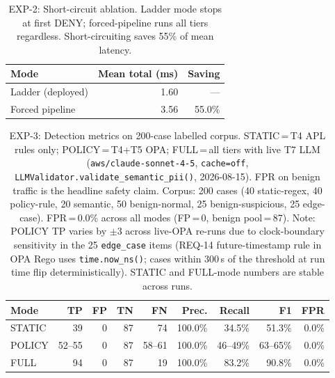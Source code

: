 \begin{table}[t]
\centering
\small
\caption{EXP-2: Short-circuit ablation.
  Ladder mode stops at first DENY; forced-pipeline runs all tiers regardless.
  Short-circuiting saves 55\% of mean latency.}
\label{tab:exp2-ablation}
\begin{tabular}{lrr}
\hline
\textbf{Mode} & \textbf{Mean total (ms)} & \textbf{Saving} \\
\hline
Ladder (deployed)  & 1.60 & —     \\
Forced pipeline    & 3.56 & 55.0\% \\
\hline
\end{tabular}
\end{table}

\begin{table}[t]
\centering
\small
\caption{EXP-3: Detection metrics on 200-case labelled corpus.
  STATIC\,=\,T4 APL rules only; POLICY\,=\,T4+T5 OPA; FULL\,=\,all tiers
  with live T7 LLM (\texttt{aws/claude-sonnet-4-5}, \texttt{cache=off},
  \texttt{LLMValidator.validate\_semantic\_pii()}, 2026-08-15).
  FPR on benign traffic is the headline safety claim.
  Corpus: 200 cases (40 static-regex, 40 policy-rule, 20 semantic,
  50 benign-normal, 25 benign-suspicious, 25 edge-case).
  FPR\,=\,0.0\% across all modes (FP\,=\,0, benign pool\,=\,87).
  Note: POLICY TP varies by $\pm$3 across live-OPA re-runs due to
  clock-boundary sensitivity in the 25 \texttt{edge\_case} items
  (REQ-14 future-timestamp rule in OPA Rego uses \texttt{time.now\_ns()};
  cases within 300\,s of the threshold at run time flip deterministically).
  STATIC and FULL-mode numbers are stable across runs.}
\label{tab:exp3-detection}
\begin{tabular}{lrrrrrrrr}
\hline
\textbf{Mode} & \textbf{TP} & \textbf{FP} & \textbf{TN} & \textbf{FN}
  & \textbf{Prec.} & \textbf{Recall} & \textbf{F1} & \textbf{FPR} \\
\hline
STATIC & 39 & 0 & 87 & 74 & 100.0\% & 34.5\% & 51.3\% & 0.0\% \\
POLICY & 52--55 & 0 & 87 & 58--61 & 100.0\% & 46--49\% & 63--65\% & 0.0\% \\
FULL   & 94 & 0 & 87 & 19 & 100.0\% & 83.2\% & 90.8\% & 0.0\% \\
\hline
\end{tabular}
\end{table}

